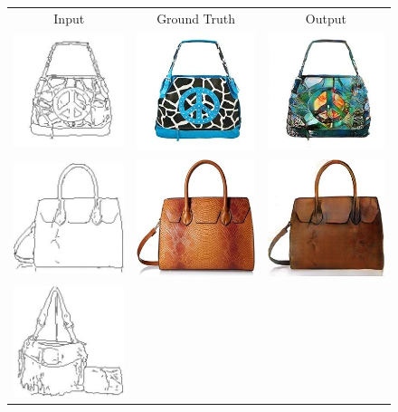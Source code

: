 \documentclass[a4paper]{book}
\begin{document}
\begin{figure}[t]
    \centering
    \begin{tabular}{ccc}
    Input & Ground Truth & Output \\
    \includegraphics[width=.15\linewidth]{images/handbags_edges_lotsofresults_latex/input_106_AB.jpg} &
    \includegraphics[width=.15\linewidth]{images/handbags_edges_lotsofresults_latex/gt_106_AB.jpg} &
    \includegraphics[width=.15\linewidth]{images/handbags_edges_lotsofresults_latex/L1cGAN_106_AB.jpg} \\
    \includegraphics[width=.15\linewidth]{images/handbags_edges_lotsofresults_latex/input_12_AB.jpg} &
    \includegraphics[width=.15\linewidth]{images/handbags_edges_lotsofresults_latex/gt_12_AB.jpg} &
    \includegraphics[width=.15\linewidth]{images/handbags_edges_lotsofresults_latex/L1cGAN_12_AB.jpg} \\
    \includegraphics[width=.15\linewidth]{images/handbags_edges_lotsofresults_latex/input_130_AB.jpg} &

\end{tabular}
\end{figure}
\end{document}
